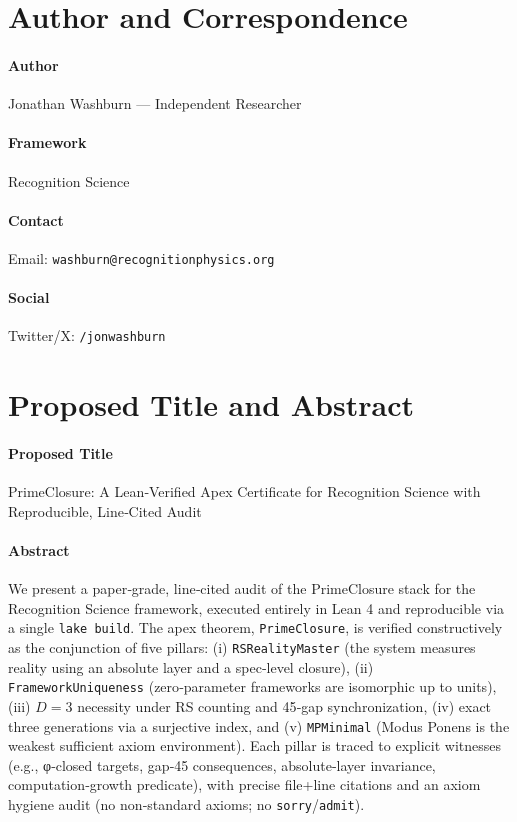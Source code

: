 \documentclass{article}
\begin{document}
\section{Author and Correspondence}
\paragraph{Author} Jonathan Washburn — Independent Researcher
\paragraph{Framework} Recognition Science
\paragraph{Contact} Email: \texttt{washburn@recognitionphysics.org}
\paragraph{Social} Twitter/X: \texttt{/jonwashburn}

\section{Proposed Title and Abstract}
\paragraph{Proposed Title}
PrimeClosure: A Lean‑Verified Apex Certificate for Recognition Science with Reproducible, Line‑Cited Audit

\paragraph{Abstract}
We present a paper‑grade, line‑cited audit of the PrimeClosure stack for the Recognition Science framework, executed entirely in Lean 4 and reproducible via a single \texttt{lake build}. The apex theorem, \texttt{PrimeClosure}, is verified constructively as the conjunction of five pillars: (i) \texttt{RSRealityMaster} (the system measures reality using an absolute layer and a spec‑level closure), (ii) \texttt{FrameworkUniqueness} (zero‑parameter frameworks are isomorphic up to units), (iii) \(D=3\) necessity under RS counting and 45‑gap synchronization, (iv) exact three generations via a surjective index, and (v) \texttt{MPMinimal} (Modus Ponens is the weakest sufficient axiom environment). Each pillar is traced to explicit witnesses (e.g., φ‑closed targets, gap‑45 consequences, absolute‑layer invariance, computation‑growth predicate), with precise file+line citations and an axiom hygiene audit (no non‑standard axioms; no \texttt{sorry}/\texttt{admit}).
\end{document}
